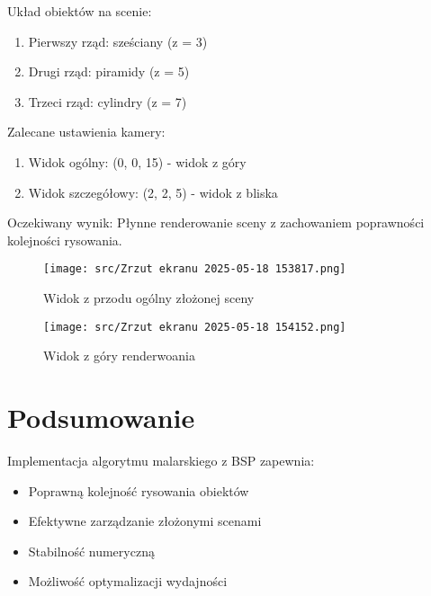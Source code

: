 \documentclass[a4paper,12pt]{article}
\begin{document}
Układ obiektów na scenie:
\begin{enumerate}
    \item Pierwszy rząd: sześciany (z = 3)
    \item Drugi rząd: piramidy (z = 5)
    \item Trzeci rząd: cylindry (z = 7)
\end{enumerate}

Zalecane ustawienia kamery:
\begin{enumerate}
    \item Widok ogólny: (0, 0, 15) - widok z góry
    \item Widok szczegółowy: (2, 2, 5) - widok z bliska
\end{enumerate}

Oczekiwany wynik: Płynne renderowanie sceny z zachowaniem poprawności kolejności rysowania.

\begin{figure}[h]
    \centering
    \begin{minipage}{0.48\textwidth}
        \centering
        \texttt{[image: src/Zrzut ekranu 2025-05-18 153817.png]}
        \caption{Widok z przodu ogólny złożonej sceny}
    \end{minipage}
    \hfill
    \begin{minipage}{0.48\textwidth}
        \centering
        \texttt{[image: src/Zrzut ekranu 2025-05-18 154152.png]}
        \caption{Widok z góry renderwoania}
    \end{minipage}
\end{figure}

\section{Podsumowanie}

Implementacja algorytmu malarskiego z BSP zapewnia:
\begin{itemize}
    \item Poprawną kolejność rysowania obiektów
    \item Efektywne zarządzanie złożonymi scenami
    \item Stabilność numeryczną
    \item Możliwość optymalizacji wydajności
\end{itemize}
\end{document}
